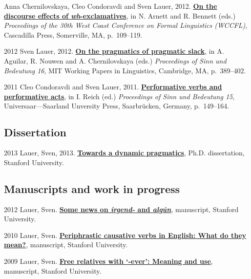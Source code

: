 \begin{dated}
		Anna Chernilovskaya, Cleo Condoravdi and Sven Lauer, 2012.
		\href{http://www.lingref.com/cpp/wccfl/30/paper2809.pdf}{\textbf{On the discourse effects of {\it wh}-exclamatives}}, 
		in N. Arnett and R. Bennett (eds.) 
		\textit{Proceedings of the 30th West Coast Conference on Formal Linguistics (WCCFL)}, 
		Cascadilla Press, Somerville, MA, p.~109--119.
	\item[2012]
		Sven Lauer, 2012. 
		\href{http://www.sven-lauer.net/output/Lauer-SuB16-LooseTalk-paper.pdf}{\textbf{On the pragmatics of pragmatic slack}}, 
		in A. Aguilar, R. Nouwen and A. Chernilovskaya (eds.) 
		\textit{Proceedings of Sinn und Bedeutung 16}, MIT Working Papers in Linguistics, 
		Cambridge, MA, p.~389--402.
	\item[2011]
		Cleo Condoravdi and Sven Lauer, 2011.
		\href{http://universaar.uni-saarland.de/monographien/volltexte/2011/30/artikel/Condoravdi_Lauer_sub15.pdf}{\textbf{Performative verbs and performative acts}}, 
		in I. Reich (ed.) 
		\textit{Proceedings of Sinn und Bedeutung 15},
		 Universaar---Saarland Unversity Press, Saarbr\"ucken, Germany, p.~149--164.
\end{dated}
\subsection*{Dissertation}
\begin{dated}
	\item[2013]
	Lauer, Sven, 2013.
	\href{http://sven-lauer.net/output/Lauer-Dissertation-DynamicPragmatics.pdf}{\textbf{Towards a dynamic pragmatics}}, 
	Ph.D. dissertation, Stanford University.
\end{dated}
\subsection*{Manuscripts and work in progress}
\begin{dated}
	\item[2012]
		Lauer, Sven. 
		\href{http://www.sven-lauer.net/output/Lauer-irgend-algun.pdf}{\textbf{Some news on {\it irgend-} and {\it alg\'un}}}, 
		manuscript, Stanford University.
	\item[2010]
		Lauer, Sven. 
		\href{http://sven-lauer.net/output/Lauer-QP-causatives.pdf}{\textbf{Periphrastic causative verbs in English: What do they mean?}}, 
		manuscript, Stanford University.
	\item[2009]
		Lauer, Sven. 
		\href{http://sven-lauer.net/output/Lauer-EVER-free-relatives.pdf}{\textbf{Free relatives with `-ever': Meaning and use}}, 
		manuscript, Stanford University.
\end{dated}
